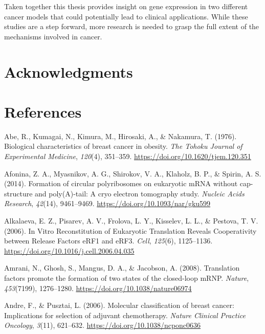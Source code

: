 \documentclass[12pt,openany]{book}
\begin{document}
Taken together this thesis provides insight on gene expression in two
different cancer models that could potentially lead to clinical
applications. While these studies are a step forward, more research is
needed to grasp the full extent of the mechanisms involved in cancer.

\chapter*{Acknowledgments}\label{acknowledgments}

\chapter*{References}\label{references}

\hypertarget{refs}{}
\hypertarget{ref-Abe1976}{}
Abe, R., Kumagai, N., Kimura, M., Hirosaki, A., \& Nakamura, T. (1976).
Biological characteristics of breast cancer in obesity. \emph{The Tohoku
Journal of Experimental Medicine}, \emph{120}(4), 351--359.
\url{https://doi.org/10.1620/tjem.120.351}

\hypertarget{ref-Afonina2014}{}
Afonina, Z. A., Myasnikov, A. G., Shirokov, V. A., Klaholz, B. P., \&
Spirin, A. S. (2014). Formation of circular polyribosomes on eukaryotic
mRNA without cap-structure and poly(A)-tail: A cryo electron tomography
study. \emph{Nucleic Acids Research}, \emph{42}(14), 9461--9469.
\url{https://doi.org/10.1093/nar/gku599}

\hypertarget{ref-Alkalaeva2006}{}
Alkalaeva, E. Z., Pisarev, A. V., Frolova, L. Y., Kisselev, L. L., \&
Pestova, T. V. (2006). In Vitro Reconstitution of Eukaryotic Translation
Reveals Cooperativity between Release Factors eRF1 and eRF3.
\emph{Cell}, \emph{125}(6), 1125--1136.
\url{https://doi.org/10.1016/j.cell.2006.04.035}

\hypertarget{ref-Amrani2008}{}
Amrani, N., Ghosh, S., Mangus, D. A., \& Jacobson, A. (2008).
Translation factors promote the formation of two states of the
closed-loop mRNP. \emph{Nature}, \emph{453}(7199), 1276--1280.
\url{https://doi.org/10.1038/nature06974}

\hypertarget{ref-Andre2006}{}
Andre, F., \& Pusztai, L. (2006). Molecular classification of breast
cancer: Implications for selection of adjuvant chemotherapy.
\emph{Nature Clinical Practice Oncology}, \emph{3}(11), 621--632.
\url{https://doi.org/10.1038/ncponc0636}
\end{document}
